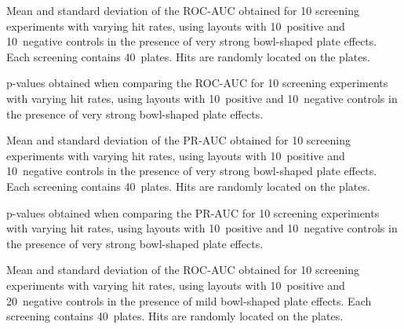 \begin{table}[p]
    \centering
    \small
    
    \caption{Mean and standard deviation of the ROC-AUC obtained for 10 screening experiments with varying hit rates, using layouts with 10~positive and 10~negative controls in the presence of very strong bowl-shaped plate effects. Each screening contains 40~plates. Hits are randomly located on the plates.}
    \label{tab:screening-roc_10-10-0.2}
\end{table}

\begin{table}[p]
    \centering
    \small
    
    \caption{p-values obtained when comparing the ROC-AUC for 10 screening experiments with varying hit rates, using layouts with 10~positive and 10~negative controls in the presence of very strong bowl-shaped plate effects.}
    \label{tab:screening-roc_pvalues-10-10-0.2}
\end{table}

\begin{table}[p]
    \centering
    \small
    
    \caption{Mean and standard deviation of the PR-AUC obtained for 10 screening experiments with varying hit rates, using layouts with 10~positive and 10~negative controls in the presence of very strong bowl-shaped plate effects. Each screening contains 40~plates. Hits are randomly located on the plates.}
    \label{tab:screening-pr_10-10-0.2}
\end{table}

\begin{table}[p]
    \centering
    \small
    
    \caption{p-values obtained when comparing the PR-AUC for 10 screening experiments with varying hit rates, using layouts with 10~positive and 10~negative controls in the presence of very strong bowl-shaped plate effects.}
    \label{tab:screening-pr_pvalues-10-10-0.2}
\end{table}

\clearpage
\begin{table}[p]
    \centering
    \small
    
    \caption{Mean and standard deviation of the ROC-AUC obtained for 10 screening experiments with varying hit rates, using layouts with 10~positive and 20~negative controls in the presence of mild bowl-shaped plate effects. Each screening contains 40~plates. Hits are randomly located on the plates.}
    \label{tab:screening-roc_20-10-0.06}
\end{table}

